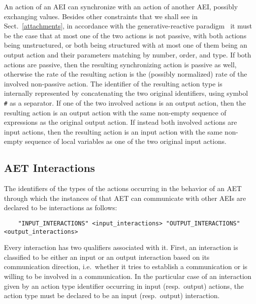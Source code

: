 An action of an AEI can synchronize with an action of another AEI, possibly exchanging values. Besides other
constraints that we shall see in Sect.~\ref{attachments}, in accordance with the generative-reactive
paradigm~\cite{BB2} it must be the case that at most one of the two actions is not passive, with both
actions being unstructured, or both being structured with at most one of them being an output action and
their parameters matching by number, order, and type. If both actions are passive, then the resulting
synchronizing action is passive as well, otherwise the rate of the resulting action is the (possibly
normalized) rate of the involved non-passive action. The identifier of the resulting action type is
internally represented by concatenating the two original identifiers, using symbol {\tt \#} as a separator.
If one of the two involved actions is an output action, then the resulting action is an output action with
the same non-empty sequence of expressions as the original output action. If instead both involved actions
are input actions, then the resulting action is an input action with the same non-empty sequence of local
variables as one of the two original input actions.


\subsection{AET Interactions}

The identifiers of the types of the actions occurring in the behavior of an AET through which the instances
of that AET can communicate with other AEIs are declared to be interactions as follows:

	\begin{verbatim}
    "INPUT_INTERACTIONS" <input_interactions> "OUTPUT_INTERACTIONS" <output_interactions>
	\end{verbatim}

Every interaction has two qualifiers associated with it. First, an interaction is classified to be either
an input or an output interaction based on its communication direction, i.e.\ whether it tries to establish
a communication or is willing to be involved in a communication. In the particular case of an interaction
given by an action type identifier occurring in input (resp.\ output) actions, the action type must be
declared to be an input (resp.\ output) interaction.

